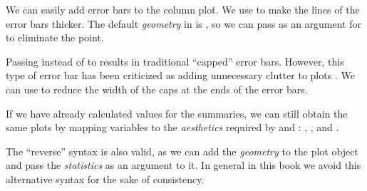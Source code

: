 \documentclass[krantz2]{krantz}\usepackage{knitr}
\begin{document}
We can easily add error bars to the column plot. We use  to make the lines of the error bars thicker. The default \emph{geometry} in  is , so we can pass  as an argument for  to eliminate the point.

\begin{knitrout}\footnotesize
{}\color{fgcolor}\begin{kframe}
\begin{alltt}
  \hlstd{(} \hlstd{=} \hlstd{,}  \hlstd{=} \hlstd{,}
                \hlstd{=} \hlstd{,}  \hlstd{=} \hlstd{)}
\end{alltt}
\end{kframe}
\end{knitrout}

Passing  instead of  to  results in traditional ``capped'' error bars. However, this type of error bar has been criticized as adding unnecessary clutter to plots \autocite{Tufte1983}. We can use  to reduce the width of the caps at the ends of the error bars.

If we have already calculated values for the summaries, we can still obtain the same plots by mapping variables to the \emph{aesthetics} required by  and : , ,  and .

\begin{explainbox}
The ``reverse'' syntax is also valid, as we can add the \emph{geometry} to the plot object and pass the \emph{statistics} as an argument to it. In general in this book we avoid this alternative syntax for the sake of consistency.

\begin{knitrout}\footnotesize
{}\color{fgcolor}\begin{kframe}
\begin{alltt}
  \hlopt{+}
  \hlstd{(} \hlstd{=} \hlstd{,}  
\end{alltt}
\end{kframe}
\end{knitrout}
\end{explainbox}
\end{document}
